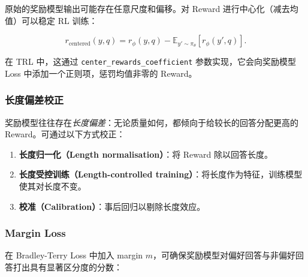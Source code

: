 原始的奖励模型输出可能存在任意尺度和偏移。对 Reward 进行中心化（减去均值）可以稳定 RL 训练：

\[
r_{\text{centered}}(y, q) = r_\phi(y, q) - \mathbb{E}_{y' \sim \pi_\theta}[r_\phi(y', q)].
\]

在 TRL 中，这通过 \texttt{center\_rewards\_coefficient} 参数实现，它会向奖励模型 Loss 中添加一个正则项，惩罚均值非零的 Reward。

\subsubsection*{长度偏差校正}
\label{length-bias-correction}

奖励模型往往存在\emph{长度偏差}：无论质量如何，都倾向于给较长的回答分配更高的 Reward。可通过以下方式校正：

\begin{enumerate}
  \item \textbf{长度归一化（Length normalisation）}：将 Reward 除以回答长度。
  \item \textbf{长度受控训练（Length-controlled training）}：将长度作为特征，训练模型使其对长度不变。
  \item \textbf{校准（Calibration）}：事后回归以剔除长度效应。
\end{enumerate}

\subsubsection*{Margin Loss}
\label{margin-losses}

在 Bradley-Terry Loss 中加入 margin $m$，可确保奖励模型对偏好回答与非偏好回答打出具有显著区分度的分数：

